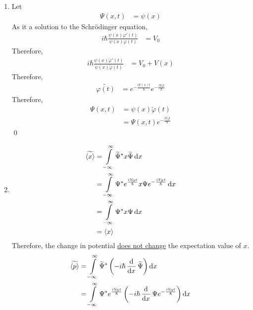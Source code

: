 \documentclass[fleqn, a4paper, 11pt, oneside]{amsart}
\theoremstyle{definition}
\theoremstyle{theorem}
\renewcommand{\emph}{\uline}
\renewcommand{\tilde}{\widetilde}
\begin{document}
\begin{solution}
	\begin{enumerate}[leftmargin=*]
		\item
			Let
			\begin{align*}
				\Psi(x,t) & = \psi(x)
			\end{align*}
			As it a solution to the Schrödinger equation,
			\begin{align*}
				i \hbar \frac{\psi(x) \varphi'(t)}{\psi(x) \varphi(t)} & = V_0
			\end{align*}
			Therefore,
			\begin{align*}
				i \hbar \frac{\psi(x) \tilde{\varphi}'(t)}{\psi(x) \tilde{\varphi}(t)} & = V_0 + V(x)
			\end{align*}
			Therefore,
			\begin{align*}
				\tilde{\varphi(t)} & = e^{-\frac{i V(x) t}{\hbar}} e^{-\frac{i V_0 t}{\hbar}}
			\end{align*}
			Therefore,
			\begin{align*}
				\Psi(x,t) & = \psi(x) \tilde{\varphi}(t) \\
                                          & = \Psi(x,t) e^{-\frac{i V_0 t}{\hbar}}
			\end{align*}
			\qed
		\item
			\begin{align*}
				\tilde{\langle x \rangle} & = \int\limits_{-\infty}^{\infty} \tilde{\Psi}^* x \tilde{\Psi} \dif x                                      \\
                                                          & = \int\limits_{-\infty}^{\infty} \Psi^* e^{\frac{i V_0 t}{\hbar}} x \Psi e^{-\frac{i V_0 t}{\hbar}} \dif x \\
                                                          & = \int\limits_{-\infty}^{\infty} \Psi^* x \Psi \dif x                                                      \\
                                                          & = \langle x \rangle
			\end{align*}
			Therefore, the change in potential \emph{does not change} the expectation value of $x$.
			\begin{align*}
				\tilde{\langle p \rangle} & = \int\limits_{-\infty}^{\infty} \tilde{\Psi}^* \left( -i \hbar \dod{}{x} \tilde{\Psi} \right) \dif x                                      \\
                                                          & = \int\limits_{-\infty}^{\infty} \Psi^* e^{\frac{i V_0 t}{\hbar}} \left( -i \hbar \dod{}{x} \Psi e^{-\frac{i V_0 t}{\hbar}} \right) \dif x \\

\end{align*}
\end{enumerate}
\end{solution}
\end{document}
